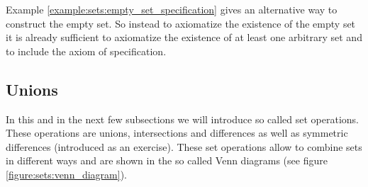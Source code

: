 Example \ref{example:sets:empty_set_specification} gives an alternative way to construct the empty set. So instead to axiomatize the existence of the empty set it is already sufficient to axiomatize the existence of at least one arbitrary set and to include the axiom of specification.

\subsection{Unions}

In this and in the next few subsections we will introduce so called set operations. These operations are unions, intersections and differences as well as symmetric differences (introduced as an exercise). These set operations allow to combine sets in different ways and are shown in the so called Venn diagrams (see figure \ref{figure:sets:venn_diagram}).

